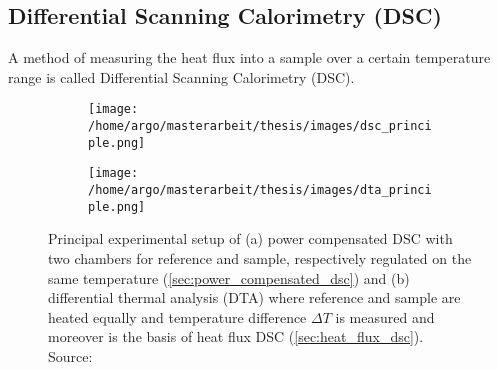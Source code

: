 \documentclass{scrartcl}[12pt, halfparskip]
\numberwithin{equation}{section}
\numberwithin{figure}{section}
\numberwithin{table}{section}
\begin{document}
\subsection{Differential Scanning Calorimetry (DSC)}
\label{sec:physics_DSC}
A method of measuring the heat flux into a sample over a certain temperature range is called Differential Scanning Calorimetry (DSC). 

\begin{figure}[H]
	\centering
	\begin{subfigure}{0.49\textwidth}
		\texttt{[image: /home/argo/masterarbeit/thesis/images/dsc\_principle.png]}
		\caption{}
		\label{fig:DSC_power_compensated_principle}
	\end{subfigure}
	\begin{subfigure}{0.49\textwidth}
		\texttt{[image: /home/argo/masterarbeit/thesis/images/dta\_principle.png]}
		\caption{}
		\label{fig:DTA_principle}
	\end{subfigure}
	\caption{Principal experimental setup of (a) power compensated DSC with two chambers for reference and sample, respectively regulated on the same temperature (\cref{sec:power_compensated_dsc}) and (b) differential thermal analysis (DTA) where reference and sample are heated equally and temperature difference $\Delta T$ is measured and moreover is the basis of heat flux DSC (\cref{sec:heat_flux_dsc}). Source: \cite{DSC_buch}}
\end{figure}
\end{document}
